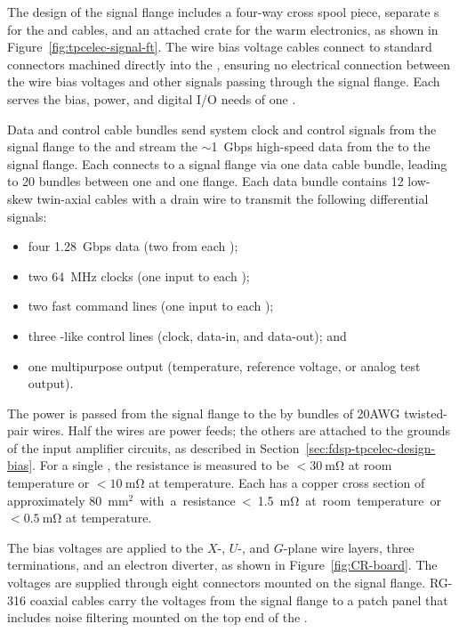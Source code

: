 The design of the signal flange includes a four-way cross spool 
piece, separate  \fdth{}s for the  and 
 cables, and an attached crate for the  
warm electronics, as shown in Figure~\ref{fig:tpcelec-signal-ft}.
The wire bias voltage cables connect to standard  
connectors machined directly into the  \fdth, ensuring 
no electrical connection between the wire bias voltages and other 
signals passing through the signal flange. Each  \fdth 
serves the bias, power, and digital I/O needs of one .  

Data and control cable bundles send system clock and control signals 
from the signal flange to the  and stream the $\sim$\SI{1}{Gbps} 
high-speed data from the  to the signal flange. Each 
 connects to a signal flange via one data cable bundle, 
leading to \num{20} bundles between one  and one flange. 
Each data bundle contains 12 low-skew twin-axial cables with a drain 
wire to transmit the following differential signals:
\begin{itemize}
\item four \SI{1.28}{Gbps} data (two from each );
\item two \SI{64}{MHz} clocks (one input to each );
\item two fast command lines (one input to each );
\item three -like control lines (clock, data-in, and data-out); and
\item one multipurpose  output (temperature, 
reference voltage, or analog test output).
\end{itemize}

The  power is passed from the signal flange to the 
 by bundles of \num{20}AWG twisted-pair wires. Half 
the wires are power feeds; the others are attached to the grounds 
of the input amplifier circuits, as described in 
Section~\ref{sec:fdsp-tpcelec-design-bias}.
For a single , the resistance is measured to be 
$<\SI{30}{\milli\ohm}$ at room temperature or $<\SI{10}{\milli\ohm}$ 
at  temperature. Each  has a copper 
cross section of approximately \SI{80}{mm$^2$} with a 
resistance <\SI{1.5}{\milli\ohm} at room temperature or 
$<\SI{0.5}{\milli\ohm}$ at  temperature.

The bias voltages are applied to the $X$-, $U$-, and $G$-plane 
wire layers, three  terminations, and an electron diverter, 
as shown in Figure~\ref{fig:CR-board}. The voltages are supplied 
through eight  connectors mounted on the signal flange. 
RG-316 coaxial cables carry the voltages from the signal flange to 
a patch panel  that includes noise filtering mounted on the top 
end of the . 

